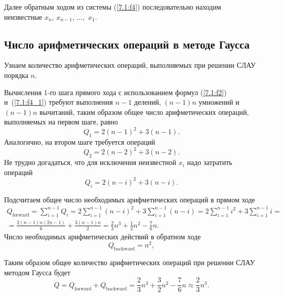 \documentclass[12pt]{article}
\begin{document}
    Далее обратным ходом из системы (\ref{7.1:f4}) последовательно находим неизвестные $x_n$, $x_{n-1}$, $\ldots$,~$x_1$.

    \subsection*{Число арифметических операций в методе Гаусса}

    Узнаем количество арифметических операций, выполняемых при решении СЛАУ порядка $n$.

    Вычисления 1-го шага прямого хода с использованием формул (\ref{7.1:f2}) и~(\ref{7.1:f4_1}) требуют выполнения $n-1$ делений, $\left(n-1\right)n$ умножений и $\left(n-1\right)n$ вычитаний, таким образом общее число арифметических операций, выполняемых на первом шаге, равно
    \begin{equation}
        Q_1=2\left(n-1\right)^2+3\left(n-1\right).
    \end{equation}
    Аналогично, на втором шаге требуется операций
    \begin{equation}
        Q_2=2\left(n-2\right)^2+3\left(n-2\right).
    \end{equation} 
    Не трудно догадаться, что для исключения неизвестной $x_i$ надо затратить операций
    \begin{equation}
        Q_i=2\left(n-i\right)^2+3\left(n-i\right).
    \end{equation}

    Подсчитаем общее число необходимых арифметических операций в прямом ходе
    \begin{equation}
        \begin{gathered}
            Q_{\text{forward}}=\sum^{n-1}_{i=1}Q_i=2\sum_{i=1}^{n-1}\left(n-i\right)^2+3\sum_{i=1}^{n-1}\left(n-i\right)=2\sum_{i=1}^{n-1}i^2+3\sum_{i=1}^{n-1}i=\\=\frac{2\left(n-1\right)n\left(2n-1\right)}{6}+\frac{3\left(n-1\right)n}{2}=\frac{2}{3}n^3+\frac{1}{2}n^2-\frac{7}{6}n.
        \end{gathered}
    \end{equation}
    Число необходимых арифметических действий в обратном ходе
    \begin{equation}
        Q_{\text{backward}}=n^2,
    \end{equation}

    Таким образом общее количество арифметических операций при решении СЛАУ методом Гаусса будет
    \begin{equation}
        Q=Q_{\text{forward}}+Q_{\text{backward}}=\frac{2}{3}n^3+\frac{3}{2}n^2-\frac{7}{6}n\approx\frac{2}{3}n^3.
    \end{equation}
\end{document}
